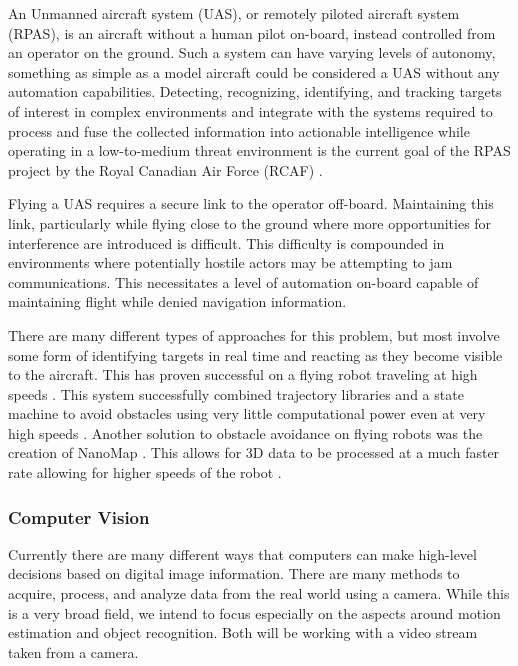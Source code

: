 \documentclass{article}
\begin{document}
		An Unmanned aircraft system (UAS), or remotely piloted aircraft system (RPAS), is an aircraft without a human pilot on-board, instead controlled from an operator on the ground. Such a system can have varying levels of autonomy, something as simple as a model aircraft could be considered a UAS without any automation capabilities. Detecting, recognizing, identifying, and tracking targets of interest in complex environments and integrate with the systems required to process and fuse the collected information into actionable intelligence while operating in a low-to-medium threat environment is the current goal of the RPAS project by the Royal Canadian Air Force (RCAF) \cite{RPAS}. 
		
		Flying a UAS requires a secure link to the operator off-board. Maintaining this link, particularly while flying close to the ground where more opportunities for interference are introduced is difficult. This difficulty is compounded in environments where potentially hostile actors may be attempting to jam communications. This necessitates a level of automation on-board capable of maintaining flight while denied navigation information.
		
		There are many different types of approaches for this problem, but most involve some form of identifying targets in real time and reacting as they become visible to the aircraft. This has proven successful on a flying robot traveling at high speeds \cite{barry2015pushbroom}. This system successfully combined trajectory libraries and a state machine to avoid obstacles using very little computational power even at very high speeds \cite{barry2018high}. Another solution to obstacle avoidance on flying robots was the creation of NanoMap \cite{2018nanomap}. This allows for 3D data to be processed at a much faster rate allowing for higher speeds of the robot \cite{2018nanomap}.
		
		\subsubsection{Computer Vision}
		
		Currently there are many different ways that computers can make high-level decisions based on digital image information. There are many methods to acquire, process, and analyze data from the real world using a camera. While this is a very broad field, we intend to focus especially on the aspects around motion estimation and object recognition. Both will be working with a video stream taken from a camera. 
		
\end{document}
